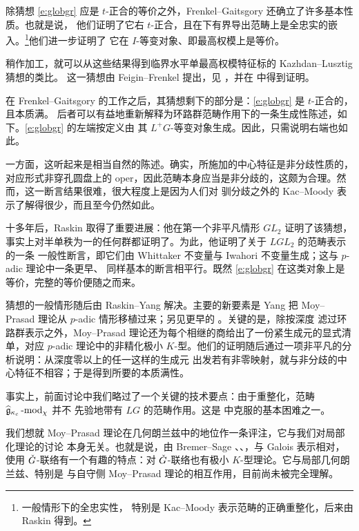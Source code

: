 	 除猜想 \eqref{e:globgr} 应是 $t$-正合的等价之外，Frenkel--Gaitsgory 还确立了许多基本性质。也就是说，
	 他们证明了它右 $t$-正合，且在下有界导出范畴上是全忠实的嵌入。\footnote{一般情形下的全忠实性，
	 特别是 Kac--Moody 表示范畴的正确重整化，后来由 Raskin \cite{RaskinLocCrit} 得到。}他们进一步证明了
	 它在 $I$-等变对象、即最高权模上是等价。

	\begin{re} 稍作加工，就可以从这些结果得到临界水平单最高权模特征标的 Kazhdan--Lusztig 猜想的类比。
	这一猜想由 Feigin--Frenkel 提出，见 \cite{arakawafiebig}，并在 \cite{DhillonYang} 中得到证明。
	\end{re}

\ssszh 在 Frenkel--Gaitsgory 的工作之后，其猜想剩下的部分是：\eqref{e:globgr} 是 $t$-正合的，且本质满。
后者可以有益地重新解释为环路群范畴作用下的一条生成性陈述，如下。\eqref{e:globgr} 的左端按定义由
其 $L^+G$-等变对象生成。因此，只需说明右端也如此。

一方面，这听起来是相当自然的陈述。确实，所施加的中心特征是非分歧性质的，对应形式非穿孔圆盘上的
oper，因此范畴本身应当是非分歧的，这颇为合理。然而，这一断言结果很难，很大程度上是因为人们对
驯分歧之外的 Kac--Moody 表示了解得很少，而且至今仍然如此。

\ssszh 十多年后，Raskin \cite{RaskinLocCrit} 取得了重要进展：他在第一个非平凡情形 $GL_2$
证明了该猜想，事实上对半单秩为一的任何群都证明了。为此，他证明了关于 $LGL_2$ 的范畴表示的一条
一般性断言，即它们由 Whittaker 不变量与 Iwahori 不变量生成；这与 $p$-adic 理论中一条更早、
同样基本的断言相平行。既然 \eqref{e:globgr} 在这类对象上是等价，完整的等价便随之而来。

猜想的一般情形随后由 Raskin--Yang \cite{RaskinYang} 解决。主要的新要素是 Yang \cite{yangmoyprasad}
把 Moy--Prasad 理论从 $p$-adic 情形移植过来；另见更早的 \cite{chenkamgarpour}。关键的是，除按深度
滤过环路群表示之外，Moy--Prasad 理论还为每个相继的商给出了一份紧生成元的显式清单，对应 $p$-adic
理论中的非精化极小 $K$-型。他们的证明随后通过一项非平凡的分析说明：从深度零以上的任一这样的生成元
出发若有非零映射，就与非分歧的中心特征不相容；于是得到所要的本质满性。

\begin{re} 事实上，前面讨论中我们略过了一个关键的技术要点：由于重整化，范畴 $\widehat{\mathfrak{g}}_{\kappa_c}\operatorname{-mod}_\chi$ 并不
先验地带有 $LG$ 的范畴作用。这是 \cite{RaskinYang} 中克服的基本困难之一。
\end{re}

\begin{re} 我们想就 Moy--Prasad 理论在几何朗兰兹中的地位作一条评注，它与我们对局部化理论的讨论
本身无关。也就是说，由 Bremer--Sage \cite{sage1}、\cite{sage2}、\cite{sage3}，与 Galois 表示相对，
使用 $\check{G}$-联络有一个有趣的特点：对 $\check{G}$-联络也有极小 $K$-型理论。它与局部几何朗兰兹、特别是
与自守侧 Moy--Prasad 理论的相互作用，目前尚未被完全理解。	\end{re}

